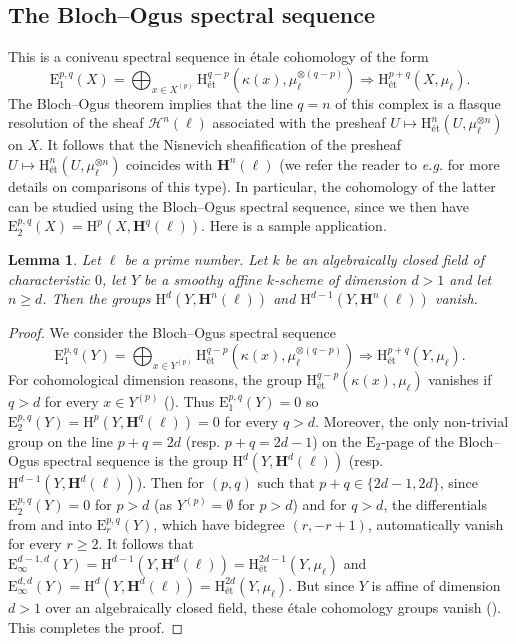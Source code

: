 \documentclass[11pt,leqno]{amsart}
\renewcommand{\1}{{\rm 1\hspace*{-0.4ex}%
\rule{0.1ex}{1.52ex}\hspace*{0.2ex}}}
\newcommand{\et}{\text{\'et}}
\newcommand{\Hr}{{\mathrm {H}}}
\newcommand{\<}[1]{{\langle}#1 {\rangle}}
\newcommand{\Er}{\mathrm{E}}
\newcommand{\Hsc}{\mathcal{H}}
\newcommand{\Hbf}{\mathbf{H}}
\theoremstyle{plain}
\newtheorem{lem}[thm]{Lemma}
\theoremstyle{definition}
\theoremstyle{remark}
\numberwithin{equation}{section}
\begin{document}
\subsection{The Bloch--Ogus spectral sequence}\label{sec:BlochOgus}

This is a coniveau spectral sequence in étale cohomology of the form \[\Er_1^{p,q}(X)=\bigoplus_{x\in X^{(p)}}\Hr_\et^{q-p}(\kappa(x),\mu_\ell^{\otimes(q-p)})\Rightarrow\Hr_\et^{p+q}(X,\mu_\ell).\] The Bloch--Ogus theorem \cite[(4.2) Theorem]{blochGerstensConjectureHomology1974} implies that the line $q=n$ of this complex is a flasque resolution of the sheaf $\Hsc^n(\ell)$ associated with the presheaf $U\mapsto\Hr_\et^n(U,\mu_\ell^{\otimes n})$ on $X$. It follows that the Nisnevich sheafification of the presheaf $U\mapsto\Hr_\et^n(U,\mu_\ell^{\otimes n})$ coincides with $\Hbf^n(\ell)$ (we refer the reader to \emph{e.g.} \cite[Theorem 2.24]{lerbetImageHigherSignature2026} for more details on comparisons of this type). In particular, the cohomology of the latter can be studied using the Bloch--Ogus spectral sequence, since we then have $\Er_2^{p,q}(X)=\Hr^p(X,\Hbf^q(\ell))$. Here is a sample application.

\begin{lem}\label{lem:bloch_ogus_alg_closed}
Let $\ell$ be a prime number. Let $k$ be an algebraically closed field of characteristic $0$, let $Y$ be a smoothy affine $k$-scheme of dimension $d>1$ and let $n\geq d$. Then the groups $\Hr^{d}(Y,\Hbf^n(\ell))$ and $\Hr^{d-1}(Y,\Hbf^n(\ell))$ vanish.
\end{lem}

\begin{proof}
We consider the Bloch--Ogus spectral sequence \[\Er_1^{p,q}(Y)=\bigoplus_{x\in Y^{(p)}}\Hr_\et^{q-p}(\kappa(x),\mu_\ell^{\otimes(q-p)})\Rightarrow\Hr_\et^{p+q}(Y,\mu_\ell).\] For cohomological dimension reasons, the group $\Hr_\et^{q-p}(\kappa(x),\mu_\ell)$ vanishes if $q>d$ for every $x\in Y^{(p)}$ (\cite[\href{https://stacks.math.columbia.edu/tag/0F0T}{Tag 0F0T}]{stacks-project}). Thus $\Er_1^{p,q}(Y)=0$ so $\Er_2^{p,q}(Y)=\Hr^p(Y,\Hbf^q(\ell))=0$ for every $q>d$. Moreover, the only non-trivial group on the line $p+q=2d$ (resp. $p+q=2d-1$) on the $\Er_2$-page of the Bloch--Ogus spectral sequence is the group $\Hr^d(Y,\Hbf^d(\ell))$ (resp. $\Hr^{d-1}(Y,\Hbf^d(\ell))$). Then for $(p,q)$ such that $p+q\in\{2d-1,2d\}$, since $\mathrm{E}_2^{p,q}(Y)=0$ for $p>d$ (as $Y^{(p)}=\emptyset$ for $p>d$) and for $q>d$, the differentials from and into $\Er_r^{p,q}(Y)$, which have bidegree $(r,-r+1)$, automatically vanish for every $r\geq 2$. It follows that $\mathrm{E}_\infty^{d-1,d}(Y)=\Hr^{d-1}(Y,\Hbf^d(\ell))=\Hr_\et^{2d-1}(Y,\mu_\ell)$ and $\mathrm{E}_\infty^{d,d}(Y)=\Hr^d(Y,\Hbf^d(\ell))=\Hr_\et^{2d}(Y,\mu_\ell)$. But since $Y$ is affine of dimension $d>1$ over an algebraically closed field, these étale cohomology groups vanish (\cite[\href{https://stacks.math.columbia.edu/tag/0F0V}{Tag 0F0V}]{stacks-project}). This completes the proof.
\end{proof}
\end{document}

